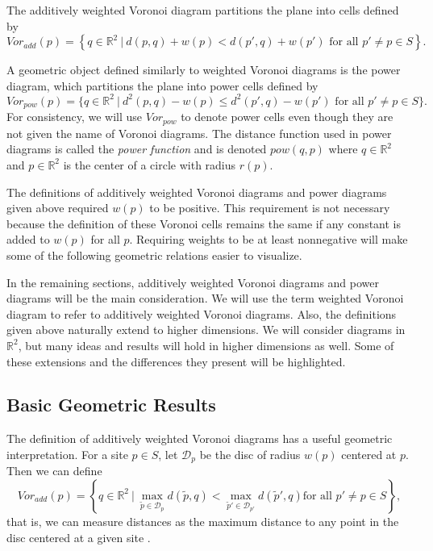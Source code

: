 \documentclass[a4paper, 11pt]{article}
\newcommand{\R}{\mathbb{R}}
\begin{document}
The additively weighted Voronoi diagram partitions the plane into cells defined by
\begin{equation*}
  Vor_{add}(p) = \left\{ q \in \R^2 \ | \ d(p,q) + w(p) < d(p',q) + w(p') \text{ for all } p' \neq p \in S \right\}.
\end{equation*}

A geometric object defined similarly to weighted Voronoi diagrams is the power diagram, which partitions the plane into power cells defined by
\begin{equation*}
  Vor_{pow}(p) = \{ q \in \R^2 \ | \ d^2(p,q) - w(p) \leq d^2(p',q) - w(p') \text{ for all } p' \neq p \in S \}.
\end{equation*}
For consistency, we will use $Vor_{pow}$ to denote power cells even though they are not given the name of Voronoi diagrams.
The distance function used in power diagrams is called the \textit{power function} and is denoted
$pow(q,p)$ where $q \in \R^2$ and $p \in \R^2$ is the center of a circle with radius $r(p)$.

The definitions of additively weighted Voronoi diagrams and power diagrams given above required $w(p)$ to be positive. This requirement is not
necessary because the definition of these Voronoi cells remains the same if any constant is added to $w(p)$ for all $p$. Requiring weights to be at
least nonnegative will make some of the following geometric relations easier to visualize.

In the remaining sections, additively weighted Voronoi diagrams and power diagrams will be the main consideration. We will use the term weighted
Voronoi diagram to refer to additively weighted Voronoi diagrams. Also, the definitions given above naturally extend to higher dimensions. We will
consider diagrams in $\R^2$, but many ideas and results will hold in higher dimensions as well. Some of these extensions and the differences they
present will be highlighted.

\subsection{Basic Geometric Results}

The definition of additively weighted Voronoi diagrams has a useful geometric interpretation. For a site $p \in S$, let $\mathcal{D}_p$ be the disc of radius $w(p)$ centered at $p$. Then we
can define
\begin{equation*}
  Vor_{add}(p) = \left\{ q \in \R^2 \ | \ \max_{\tilde{p} \in \mathcal{D}_p} d(\tilde{p}, q) < \max_{\tilde{p}' \in \mathcal{D}_{p'}} d(\tilde{p}', q) \text{
  for all } p' \neq p \in S \right\},
\end{equation*}
that is, we can measure distances as the maximum distance to any point in the disc centered at a given site \cite{rosenberger_additive}.
\end{document}
